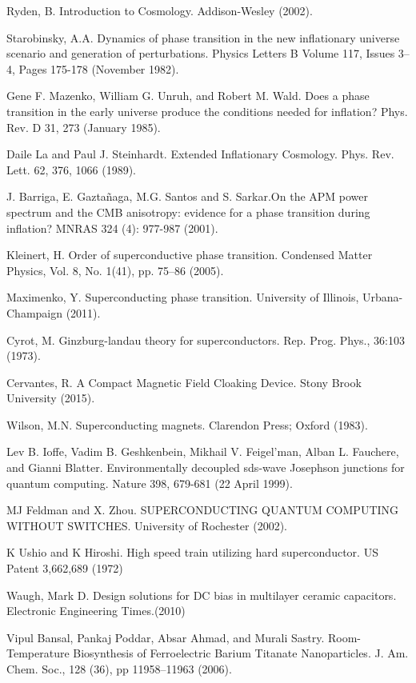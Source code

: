 \documentclass[%
 reprint,
 amsmath,amssymb,
 aps,
 pra,
]{revtex4-1}
\begin{document}
\begin{thebibliography}{6}
	Ryden, B. Introduction to Cosmology. Addison-Wesley (2002).
	
	Starobinsky, A.A. Dynamics of phase transition in the new inflationary universe scenario and generation of perturbations. Physics Letters B Volume 117, Issues 3–4, Pages 175-178 (November 1982).
	
	Gene F. Mazenko, William G. Unruh, and Robert M. Wald. Does a phase transition in the early universe produce the conditions needed for inflation? Phys. Rev. D 31, 273 (January 1985).
	
	Daile La and Paul J. Steinhardt. Extended Inflationary Cosmology. Phys. Rev. Lett. 62, 376, 1066 (1989).
	
	J. Barriga, E. Gaztañaga, M.G. Santos and S. Sarkar.On the APM power spectrum and the CMB anisotropy: evidence for a phase transition during inflation? MNRAS 324 (4): 977-987 (2001). 
	
	Kleinert, H. Order of superconductive phase transition. Condensed Matter Physics, Vol. 8, No. 1(41), pp. 75–86 (2005).
	
	Maximenko, Y. Superconducting phase transition. University of Illinois, Urbana-Champaign (2011).
	
	Cyrot, M. Ginzburg-landau theory for superconductors. Rep. Prog. Phys., 36:103 (1973).
	
	Cervantes, R. A Compact Magnetic Field Cloaking Device. Stony Brook University (2015).
	
	Wilson, M.N. Superconducting magnets. Clarendon Press; Oxford (1983).
	
	Lev B. Ioffe, Vadim B. Geshkenbein, Mikhail V. Feigel'man, Alban L. Fauchere, and Gianni Blatter. Environmentally decoupled sds-wave Josephson junctions for quantum computing. Nature 398, 679-681 (22 April 1999).
	
	MJ Feldman and X. Zhou. SUPERCONDUCTING QUANTUM COMPUTING WITHOUT SWITCHES. University of Rochester (2002).
	
	K Ushio and K Hiroshi. High speed train utilizing hard superconductor. US Patent 3,662,689 (1972)
	
	Waugh, Mark D. Design solutions for DC bias in multilayer ceramic capacitors. Electronic Engineering Times.(2010)
	
	Vipul Bansal, Pankaj Poddar, Absar Ahmad, and Murali Sastry. Room-Temperature Biosynthesis of Ferroelectric Barium Titanate Nanoparticles. J. Am. Chem. Soc., 128 (36), pp 11958–11963 (2006).

\end{thebibliography}
\end{document}
